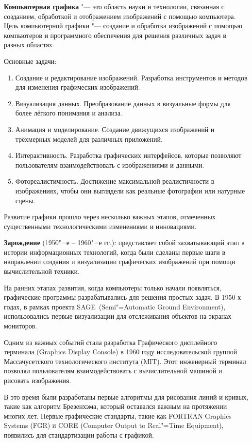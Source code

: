 \textbf{Компьютерная графика} "--- это область науки и технологии, связанная с созданием, обработкой и отображением изображений с помощью компьютера. Цель компьютерной графики "--- создание и обработка изображений с помощью компьютеров и программного обеспечения для решения различных задач в разных областях.

Основные задачи:
\begin{enumerate}
    \item Создание и редактирование изображений. Разработка инструментов и методов для изменения графических изображений.  
    \item Визуализация данных. Преобразование данных в визуальные формы для более лёгкого понимания и анализа.  
    \item Анимация и моделирование. Создание движущихся изображений и трёхмерных моделей для различных приложений.  
    \item Интерактивность. Разработка графических интерфейсов, которые позволяют пользователям взаимодействовать с изображениями и данными.  
    \item Фотореалистичность. Достижение максимальной реалистичности в изображениях, чтобы они выглядели как реальные фотографии или натурные сцены.
\end{enumerate}

Развитие графики прошло через несколько важных этапов, отмеченных существенными технологическими изменениями и инновациями.

\textbf{Зарождение} (1950"=е -- 1960"=е гг.): представляет собой захватывающий этап в истории информационных технологий, когда были сделаны первые шаги в направлении создания и визуализации графических изображений при помощи вычислительной техники.

На ранних этапах развития, когда компьютеры только начали появляться, графические программы разрабатывались для решения простых задач. В 1950-х годах, в рамках проекта \flqq SAGE\frqq\ (Semi"=Automatic Ground Environment), использовались первые визуализации для отслеживания объектов на экранах мониторов.

Одним из важных событий стала разработка Графического дисплейного терминала (Graphics Display Console) в 1960 году исследовательской группой Массачусетского технологического института (MIT). Этот инженерный терминал позволял пользователям взаимодействовать с вычислительной машиной и рисовать изображения.

В это время были разработаны первые алгоритмы для рисования линий и кривых, такие как алгоритм Брезенхэма, который оставался важным на протяжении многих лет. Первые графические стандарты, такие как FORTRAN Graphics Systems (FGR) и CORE (Computer Output to Real"=Time Equipment), появились для стандартизации работы с графикой.

